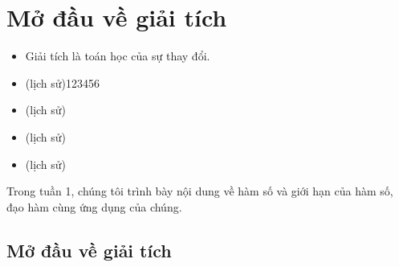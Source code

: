 \documentclass[a4paper,12pt]{book}
\begin{document}
\chapter{Mở đầu về giải tích}


\begin{itemize}
    \item Giải tích là toán học của sự thay đổi.

    \item (lịch sử)123456

    \item (lịch sử)

    \item (lịch sử)
    \item (lịch sử)

\end{itemize}
\noindent Trong tuần 1, chúng tôi trình bày nội dung về hàm số và giới hạn của hàm số, đạo hàm cùng ứng dụng của chúng.
\newpage
\section{Mở đầu về giải tích}
\end{document}
